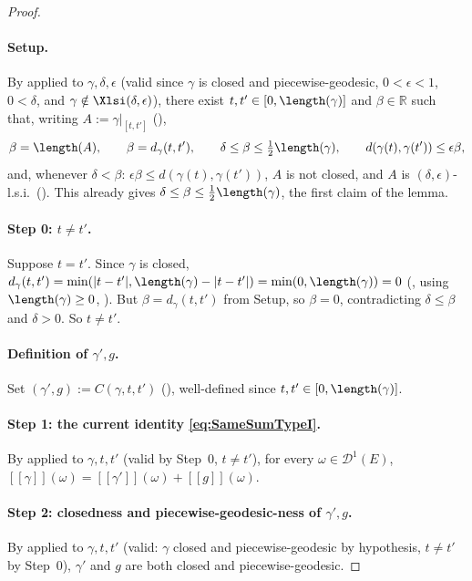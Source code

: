 \begin{proof}
  \paragraph{Setup.} By  applied to $\gamma,\delta,\epsilon$ (valid
  since $\gamma$ is closed and piecewise-geodesic, $0<\epsilon<1$, $0<\delta$, and $\gamma \notin
  \Xlsi(\delta,\epsilon)$), there exist $t,t' \in [0,\length(\gamma)]$ and $\beta \in \mathbb{R}$
  such that, writing $A := \gamma|_{[t,t']}$ (),
  \[
    \beta = \length(A) ,\qquad \beta = d_\gamma(t,t') ,\qquad \delta\le\beta\le\tfrac12\length(\gamma)
    ,\qquad d(\gamma(t),\gamma(t')) \le \epsilon\beta ,
  \]
  and, whenever $\delta<\beta$: $\epsilon\beta\le d(\gamma(t),\gamma(t'))$, $A$ is not closed, and
  $A$ is $(\delta,\epsilon)$-l.s.i.\ (). This already gives $\delta\le\beta\le
  \tfrac12\length(\gamma)$, the first claim of the lemma.

  \paragraph{Step 0: $t \ne t'$.} Suppose $t=t'$. Since $\gamma$ is closed, $d_\gamma(t,t') =
  \min(|t-t'|,\length(\gamma)-|t-t'|) = \min(0,\length(\gamma)) = 0$ (, using
  $\length(\gamma)\ge0$, ). But $\beta = d_\gamma(t,t')$ from Setup, so $\beta=0$,
  contradicting $\delta\le\beta$ and $\delta>0$. So $t\ne t'$.

  \paragraph{Definition of $\gamma',g$.} Set $(\gamma',g) := C(\gamma,t,t')$ (),
  well-defined since $t,t'\in[0,\length(\gamma)]$.

  \paragraph{Step 1: the current identity \eqref{eq:SameSumTypeI}.} By 
  applied to $\gamma,t,t'$ (valid by Step~0, $t\ne t'$), for every $\omega\in\mathcal{D}^1(E)$,
  $[[\gamma]](\omega)=[[\gamma']](\omega)+[[g]](\omega)$.

  \paragraph{Step 2: closedness and piecewise-geodesic-ness of $\gamma',g$.} By
   applied to $\gamma,t,t'$ (valid: $\gamma$ closed and piecewise-geodesic
  by hypothesis, $t\ne t'$ by Step~0), $\gamma'$ and $g$ are both closed and piecewise-geodesic.


\end{proof}
